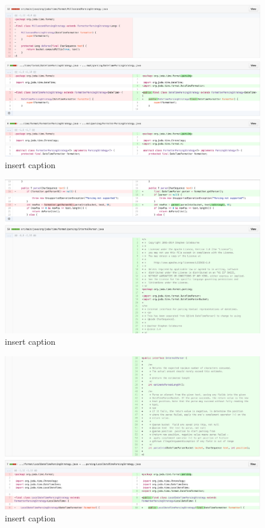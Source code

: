 \begin{figure}[H]
	\centering
	\includegraphics[width=\linewidth]{code117}
	\caption{insert caption}
\end{figure}
\begin{figure}[H]
	\centering
	\includegraphics[width=\linewidth]{code118}
	\caption{insert caption}
\end{figure}
\begin{figure}[H]
	\centering
	\includegraphics[width=\linewidth]{code119}
	\caption{insert caption}
\end{figure}
